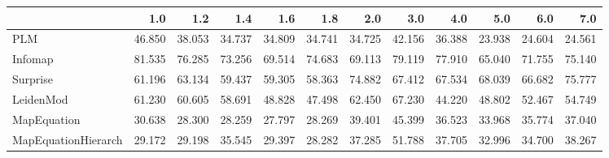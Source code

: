 \begin{tabular}{lrrrrrrrrrrr}
\toprule
{} &    1.0 &    1.2 &    1.4 &    1.6 &    1.8 &    2.0 &    3.0 &    4.0 &    5.0 &    6.0 &    7.0 \\
\midrule
PLM                 & 46.850 & 38.053 & 34.737 & 34.809 & 34.741 & 34.725 & 42.156 & 36.388 & 23.938 & 24.604 & 24.561 \\
Infomap             & 81.535 & 76.285 & 73.256 & 69.514 & 74.683 & 69.113 & 79.119 & 77.910 & 65.040 & 71.755 & 75.140 \\
Surprise            & 61.196 & 63.134 & 59.437 & 59.305 & 58.363 & 74.882 & 67.412 & 67.534 & 68.039 & 66.682 & 75.777 \\
LeidenMod           & 61.230 & 60.605 & 58.691 & 48.828 & 47.498 & 62.450 & 67.230 & 44.220 & 48.802 & 52.467 & 54.749 \\
MapEquation         & 30.638 & 28.300 & 28.259 & 27.797 & 28.269 & 39.401 & 45.399 & 36.523 & 33.968 & 35.774 & 37.040 \\
MapEquationHierarch & 29.172 & 29.198 & 35.545 & 29.397 & 28.282 & 37.285 & 51.788 & 37.705 & 32.996 & 34.700 & 38.267 \\
\bottomrule
\end{tabular}
